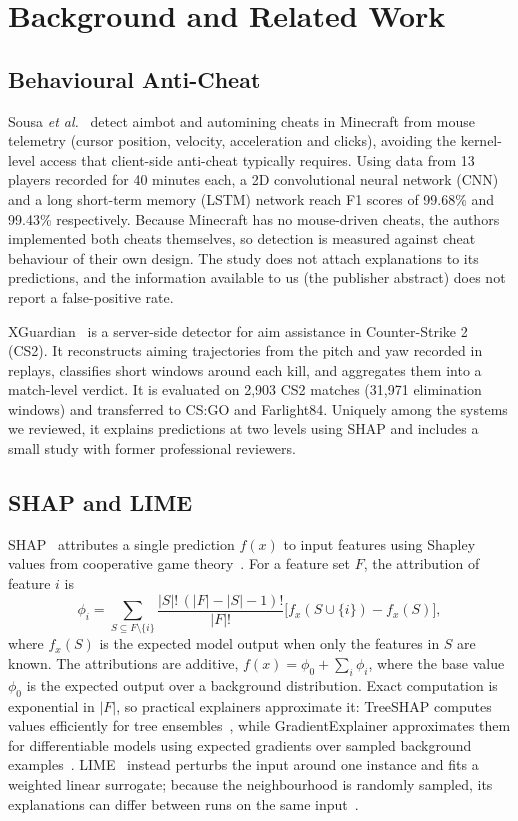 \documentclass[conference]{IEEEtran}
\begin{document}
\section{Background and Related Work}

\subsection{Behavioural Anti-Cheat}
Sousa \textit{et al.}~\cite{sousa2025minecraft} detect aimbot and automining cheats in Minecraft from mouse telemetry (cursor position, velocity, acceleration and clicks), avoiding the kernel-level access that client-side anti-cheat typically requires. Using data from 13 players recorded for 40 minutes each, a 2D convolutional neural network (CNN) and a long short-term memory (LSTM) network reach F1 scores of 99.68\% and 99.43\% respectively.
Because Minecraft has no mouse-driven cheats, the authors implemented both cheats themselves, so detection is measured against cheat behaviour of their own design.
The study does not attach explanations to its predictions, and the information available to us (the publisher abstract) does not report a false-positive rate.

XGuardian~\cite{zhang2026xguardian} is a server-side detector for aim assistance in Counter-Strike 2 (CS2). It reconstructs aiming trajectories from the pitch and yaw recorded in replays, classifies short windows around each kill, and aggregates them into a match-level verdict. It is evaluated on 2{,}903 CS2 matches (31{,}971 elimination windows) and transferred to CS:GO and Farlight84. Uniquely among the systems we reviewed, it explains predictions at two levels using SHAP and includes a small study with former professional reviewers.

\subsection{SHAP and LIME}
SHAP~\cite{lundberg2017unified} attributes a single prediction $f(x)$ to input features using Shapley values from cooperative game theory~\cite{shapley1953value}. For a feature set $F$, the attribution of feature $i$ is
\begin{equation}
\phi_i=\sum_{S\subseteq F\setminus\{i\}}\frac{|S|!\,(|F|-|S|-1)!}{|F|!}\big[f_x(S\cup\{i\})-f_x(S)\big],
\label{eq:shapley}
\end{equation}
where $f_x(S)$ is the expected model output when only the features in $S$ are known. The attributions are additive, $f(x)=\phi_0+\sum_i\phi_i$, where the base value $\phi_0$ is the expected output over a background distribution. Exact computation is exponential in $|F|$, so practical explainers approximate it: TreeSHAP computes values efficiently for tree ensembles~\cite{lundberg2020trees}, while GradientExplainer approximates them for differentiable models using expected gradients over sampled background examples~\cite{erion2021expected}. 
LIME~\cite{ribeiro2016why} instead perturbs the input around one instance and fits a weighted linear surrogate; because the neighbourhood is randomly sampled, its explanations can differ between runs on the same input~\cite{zhanglime}.
\end{document}
